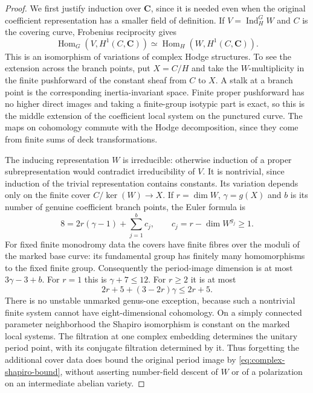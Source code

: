 \documentclass[11pt]{article}
\theoremstyle{definition}
\theoremstyle{remark}
\newcommand{\C}{\mathbf C}
\begin{document}
\begin{proof}
We first justify induction over $\C$, since it is needed even when the original coefficient representation has a smaller field of definition. If $V=\operatorname{Ind}_H^G W$ and $C$ is the covering curve, Frobenius reciprocity gives
\[
 \operatorname{Hom}_G(V,H^1(C,\C))
 \simeq\operatorname{Hom}_H(W,H^1(C,\C)).
\]
This is an isomorphism of variations of complex Hodge structures. To see the extension across the branch points, put $X=C/H$ and take the $W$-multiplicity in the finite pushforward of the constant sheaf from $C$ to $X$. A stalk at a branch point is the corresponding inertia-invariant space. Finite proper pushforward has no higher direct images and taking a finite-group isotypic part is exact, so this is the middle extension of the coefficient local system on the punctured curve. The maps on cohomology commute with the Hodge decomposition, since they come from finite sums of deck transformations.

The inducing representation $W$ is irreducible: otherwise induction of a proper subrepresentation would contradict irreducibility of $V$. It is nontrivial, since induction of the trivial representation contains constants. Its variation depends only on the finite cover $C/\ker(W)\to X$. If $r=\dim W$, $\gamma=g(X)$ and $b$ is its number of genuine coefficient branch points, the Euler formula is
\begin{equation}\label{eq:complex-cover-budget}
 8=2r(\gamma-1)+\sum_{j=1}^{b}c_j,
 \qquad c_j=r-\dim W^{g_j}\ge1.
\end{equation}
For fixed finite monodromy data the covers have finite fibres over the moduli of the marked base curve: its fundamental group has finitely many homomorphisms to the fixed finite group. Consequently the period-image dimension is at most $3\gamma-3+b$. For $r=1$ this is $\gamma+7\le12$. For $r\ge2$ it is at most
\begin{equation}\label{eq:complex-shapiro-bound}
 2r+5+(3-2r)\gamma\le2r+5.
\end{equation}
There is no unstable unmarked genus-one exception, because such a nontrivial finite system cannot have eight-dimensional cohomology. On a simply connected parameter neighborhood the Shapiro isomorphism is constant on the marked local systems. The filtration at one complex embedding determines the unitary period point, with its conjugate filtration determined by it. Thus forgetting the additional cover data does bound the original period image by \eqref{eq:complex-shapiro-bound}, without asserting number-field descent of $W$ or of a polarization on an intermediate abelian variety.


\end{proof}
\end{document}
